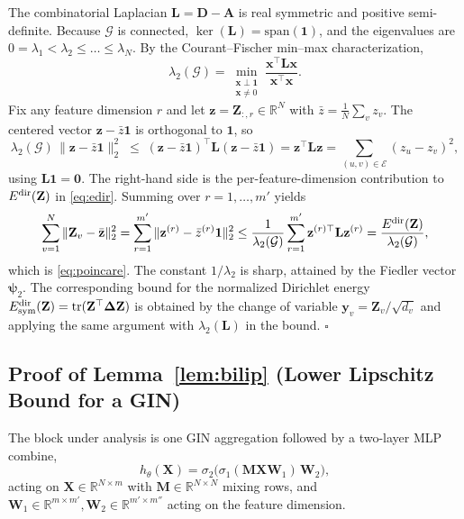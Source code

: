 The combinatorial Laplacian $\mathbf{L}=\mathbf{D}-\mathbf{A}$ is real symmetric and positive semi-definite. Because $\mathcal{G}$ is connected, $\ker(\mathbf{L})=\mathrm{span}(\mathbf{1})$, and the eigenvalues are $0=\lambda_1<\lambda_2\le\dots\le\lambda_N$. By the Courant--Fischer min--max characterization,
\begin{equation}
\lambda_2(\mathcal{G})=\min_{\substack{\mathbf{x}\perp\mathbf{1}\\\mathbf{x}\neq 0}}\frac{\mathbf{x}^\top\mathbf{L}\mathbf{x}}{\mathbf{x}^\top\mathbf{x}}.
\end{equation}
Fix any feature dimension $r$ and let $\mathbf{z}=\mathbf{Z}_{:,r}\in\mathbb{R}^N$ with $\bar{z}=\frac{1}{N}\sum_v z_v$. The centered vector $\mathbf{z}-\bar{z}\mathbf{1}$ is orthogonal to $\mathbf{1}$, so
\begin{equation}
\lambda_2(\mathcal{G})\,\|\mathbf{z}-\bar{z}\mathbf{1}\|_2^2 \;\le\; (\mathbf{z}-\bar{z}\mathbf{1})^\top\mathbf{L}(\mathbf{z}-\bar{z}\mathbf{1}) = \mathbf{z}^\top\mathbf{L}\mathbf{z}=\sum_{(u,v)\in\mathcal{E}}(z_u-z_v)^2,
\end{equation}
using $\mathbf{L}\mathbf{1}=\mathbf{0}$. The right-hand side is the per-feature-dimension contribution to $E^{\text{dir}}(\mathbf{Z})$ in \eqref{eq:edir}. Summing over $r=1,\dots,m'$ yields
\begin{equation}
\sum_{v=1}^N\|\mathbf{Z}_v-\bar{\mathbf{z}}\|_2^2=\sum_{r=1}^{m'}\|\mathbf{z}^{(r)}-\bar z^{(r)}\mathbf{1}\|_2^2 \le \frac{1}{\lambda_2(\mathcal{G})}\sum_{r=1}^{m'}\mathbf{z}^{(r)\top}\mathbf{L}\mathbf{z}^{(r)}=\frac{E^{\text{dir}}(\mathbf{Z})}{\lambda_2(\mathcal{G})},
\end{equation}
which is \eqref{eq:poincare}. The constant $1/\lambda_2$ is sharp, attained by the Fiedler vector $\bm{\psi}_2$. The corresponding bound for the normalized Dirichlet energy $E^{\text{dir}}_{\mathrm{sym}}(\mathbf{Z})=\mathrm{tr}(\mathbf{Z}^\top\mathbf{\Delta}\mathbf{Z})$ is obtained by the change of variable $\mathbf{y}_v=\mathbf{Z}_v/\sqrt{d_v}$ and applying the same argument with $\lambda_2(\mathbf{L})$ in the bound. $\square$

\subsection{Proof of Lemma~\ref{lem:bilip} (Lower Lipschitz Bound for a GIN)}

The block under analysis is one GIN aggregation followed by a two-layer MLP combine,
\begin{equation}
h_\theta(\mathbf{X})=\sigma_2\bigl(\sigma_1(\mathbf{M}\mathbf{X}\mathbf{W}_1)\,\mathbf{W}_2\bigr),
\end{equation}
acting on $\mathbf{X}\in\mathbb{R}^{N\times m}$ with $\mathbf{M}\in\mathbb{R}^{N\times N}$ mixing rows, and $\mathbf{W}_1\in\mathbb{R}^{m\times m'},\mathbf{W}_2\in\mathbb{R}^{m'\times m''}$ acting on the feature dimension.


